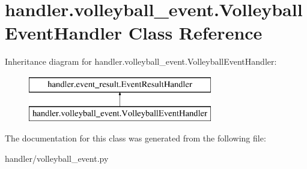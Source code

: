 \hypertarget{classhandler_1_1volleyball__event_1_1_volleyball_event_handler}{}\section{handler.\+volleyball\+\_\+event.\+Volleyball\+Event\+Handler Class Reference}
\label{classhandler_1_1volleyball__event_1_1_volleyball_event_handler}
Inheritance diagram for handler.\+volleyball\+\_\+event.\+Volleyball\+Event\+Handler\+:\begin{figure}[H]
\begin{center}
\leavevmode
\includegraphics[height=2.000000cm]{classhandler_1_1volleyball__event_1_1_volleyball_event_handler}
\end{center}
\end{figure}


The documentation for this class was generated from the following file\+:\begin{DoxyCompactItemize}
\item 
handler/volleyball\+\_\+event.\+py\end{DoxyCompactItemize}
